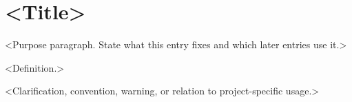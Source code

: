 
\section{<Title>}\label{ent:<slug>}

<Purpose paragraph. State what this entry fixes and which later entries use it.>


\begin{defn}[<Name>]\label{def:<slug>}
<Definition.>
\end{defn}

\begin{rem}\label{rem:<slug>-<topic>}
<Clarification, convention, warning, or relation to project-specific usage.>
\end{rem}
